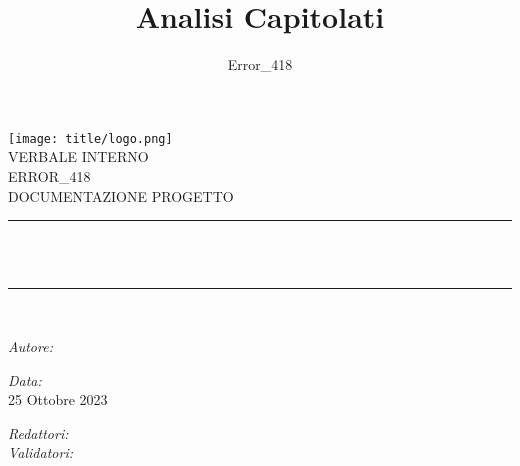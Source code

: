 \documentclass[a4paper, twoside]{article}
\title{\Huge Analisi Capitolati}
\author{Error\_418}
\newcommand{\HRule}{\rule{\linewidth}{0.5mm}}
\begin{document}
\sffamily
\begin{titlepage}
\centering
\texttt{[image: title/logo.png]}\\[1.5cm]
\center %
\textsf{\Huge VERBALE INTERNO}\\[2cm]
\textsf{\Large ERROR\_418}\\[0.5cm]
\textsf{\Large DOCUMENTAZIONE PROGETTO}\\[0.5cm]
\makeatletter
\HRule \\[0.4cm]
{ \huge \bfseries \@title}\\[0.4cm]
\HRule \\[1.5cm]
\begin{minipage}{0.4\textwidth}
\begin{flushleft} \large
\emph{Autore:}\\
\@author %
\end{flushleft}
\end{minipage}
\begin{minipage}{0.4\textwidth}
\begin{flushright} \large
\emph{Data:}\\
{\large 25 Ottobre 2023}\\[1cm]
\end{flushright}
\end{minipage}

\vspace{1cm} %

\begin{center} %
\emph{\Large Redattori:}\\
\vspace{1cm} %
\emph{\Large Validatori:}\\
\end{center}

\vfill %
\end{titlepage}

\newpage %
\tableofcontents
\newpage

\end{document}
